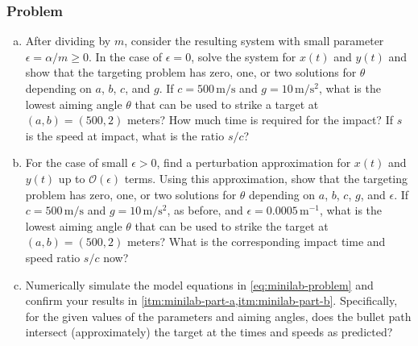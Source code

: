 \documentclass[12pt,twoside]{article}
\begin{document}
\subsubsection*{Problem}
\begin{enumerate}[(a)]
\item\label{itm:minilab-part-a} After dividing by $m$, consider the resulting
  system with small parameter $\epsilon=\alpha/m\ge0$. In the case of
  $\epsilon=0$, solve the system for $x(t)$ and $y(t)$ and show that the
  targeting problem has zero, one, or two solutions for $\theta$ depending on
  $a$, $b$, $c$, and $g$. If $c=500\,\text{m/s}$ and $g=10\,\text{m/s$^2$}$,
  what is the lowest aiming angle $\theta$ that can be used to strike a target
  at $(a,b)=(500,2)$ meters? How much time is required for the impact? If $s$ is
  the speed at impact, what is the ratio $s/c$?
\item\label{itm:minilab-part-b} For the case of small $\epsilon>0$, find a
  perturbation approximation for $x(t)$ and $y(t)$ up to $\mathcal{O}(\epsilon)$
  terms. Using this approximation, show that the targeting problem has zero,
  one, or two solutions for $\theta$ depending on $a$, $b$, $c$, $g$, and
  $\epsilon$. If $c=500\,\text{m/s}$ and $g=10\,\text{m/s$^2$}$, as before, and
  $\epsilon=0.0005\,\text{m$^{-1}$}$, what is the lowest aiming angle $\theta$
  that can be used to strike the target at $(a,b)=(500,2)$ meters? What is the
  corresponding impact time and speed ratio $s/c$ now?
\item Numerically simulate the model equations in \cref{eq:minilab-problem} and
  confirm your results in \cref{itm:minilab-part-a,itm:minilab-part-b}.
  Specifically, for the given values of the parameters and aiming angles, does
  the bullet path intersect (approximately) the target at the times and speeds
  as predicted?
\end{enumerate}
\newpage
\end{document}
